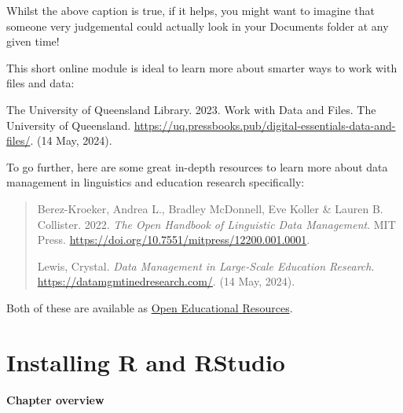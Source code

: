 \documentclass[
  letterpaper,
  DIV=11,
  numbers=noendperiod]{scrreprt}
\begin{document}
Whilst the above caption is true, if it helps, you might want to imagine
that someone very judgemental could actually look in your Documents
folder at any given time!

\begin{tcolorbox}[enhanced jigsaw, colbacktitle=quarto-callout-note-color!10!white, titlerule=0mm, toptitle=1mm, breakable, rightrule=.15mm, toprule=.15mm, leftrule=.75mm, colframe=quarto-callout-note-color-frame, arc=.35mm, colback=white, left=2mm, opacityback=0, opacitybacktitle=0.6, coltitle=black, bottomtitle=1mm, title=\textcolor{quarto-callout-note-color}{\faInfo}\hspace{0.5em}{Going further}, bottomrule=.15mm]

This short online module is ideal to learn more about smarter ways to
work with files and data:

The University of Queensland Library. 2023. Work with Data and Files.
The University of Queensland.
\url{https://uq.pressbooks.pub/digital-essentials-data-and-files/}. (14
May, 2024).

To go further, here are some great in-depth resources to learn more
about data management in linguistics and education research
specifically:

\begin{quote}
Berez-Kroeker, Andrea L., Bradley McDonnell, Eve Koller \& Lauren B.
Collister. 2022. \emph{The Open Handbook of Linguistic Data Management}.
MIT Press. \url{https://doi.org/10.7551/mitpress/12200.001.0001}.

Lewis, Crystal. \emph{Data Management in Large-Scale Education
Research}. \url{https://datamgmtinedresearch.com/}. (14 May, 2024).
\end{quote}

Both of these are available as
\href{https://elenlefoll.github.io/RstatsTextbook/OpenScholarship.html\#open-education}{Open
Educational Resources}.

\end{tcolorbox}


\chapter{Installing R and RStudio}\label{installing-r-and-rstudio}

\subsubsection*{\texorpdfstring{\textbf{Chapter
overview}}{Chapter overview}}\label{chapter-overview}
\end{document}
